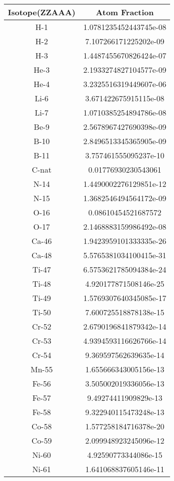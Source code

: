 \begin{table}[h!]
\centering
\begin{tabular}{|| c || c |}
\hline
Isotope(ZZAAA) & Atom Fraction \\
\hline \hline

H-1 & 1.0781235452443745e-08 \\
H-2 & 7.107266171225202e-09 \\
H-3 & 1.4487455670826424e-07 \\
He-3 & 2.1933274827104577e-09 \\
He-4 & 3.2325516319449607e-06 \\
Li-6 & 3.671422675915115e-08 \\
Li-7 & 1.0710385254894786e-08 \\
Be-9 & 2.5678967427690398e-09 \\
B-10 & 2.8496513345365905e-09 \\
B-11 & 3.757461555095237e-10 \\
C-nat & 0.01776930230543061 \\
N-14 & 1.4490002276129851e-12 \\
N-15 & 1.3682546494564172e-09 \\
O-16 & 0.08610454521687572 \\
O-17 & 2.1468883159986492e-08 \\
Ca-46 & 1.9423959101333335e-26 \\
Ca-48 & 5.5765381034100415e-31 \\
Ti-47 & 6.5753621785094384e-24 \\
Ti-48 & 4.920177871508146e-25 \\
Ti-49 & 1.5769307640345085e-17 \\
Ti-50 & 7.600725518878138e-15 \\
Cr-52 & 2.6790196841879342e-14 \\
Cr-53 & 4.9394593116626766e-14 \\
Cr-54 & 9.369597562639635e-14 \\
Mn-55 & 1.655666343005156e-13 \\
Fe-56 & 3.505002019336056e-13 \\
Fe-57 & 9.49274411909829e-13 \\
Fe-58 & 9.322940115473248e-13 \\
Co-58 & 1.577258184716378e-20 \\
Co-59 & 2.099948923245096e-12 \\
Ni-60 & 4.92590773344086e-15 \\
Ni-61 & 1.641068837605146e-11 \\

\end{tabular}
\end{table}
